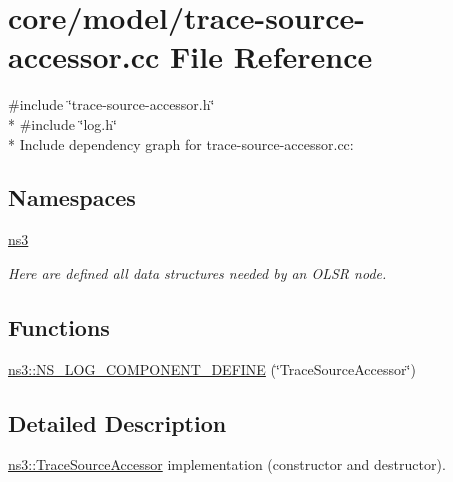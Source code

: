 \hypertarget{trace-source-accessor_8cc}{}\section{core/model/trace-\/source-\/accessor.cc File Reference}
\label{trace-source-accessor_8cc}
{\ttfamily \#include \char`\"{}trace-\/source-\/accessor.\+h\char`\"{}}\\*
{\ttfamily \#include \char`\"{}log.\+h\char`\"{}}\\*
Include dependency graph for trace-\/source-\/accessor.cc\+:
\subsection*{Namespaces}
\begin{DoxyCompactItemize}
\item 
 \hyperlink{namespacens3}{ns3}
\begin{DoxyCompactList}\small\item\em Here are defined all data structures needed by an O\+L\+SR node. \end{DoxyCompactList}\end{DoxyCompactItemize}
\subsection*{Functions}
\begin{DoxyCompactItemize}
\item 
\hyperlink{namespacens3_a5c3a334dd13b18b0bdfdf13debb83755}{ns3\+::\+N\+S\+\_\+\+L\+O\+G\+\_\+\+C\+O\+M\+P\+O\+N\+E\+N\+T\+\_\+\+D\+E\+F\+I\+NE} (\char`\"{}Trace\+Source\+Accessor\char`\"{})
\end{DoxyCompactItemize}


\subsection{Detailed Description}
\hyperlink{classns3_1_1TraceSourceAccessor}{ns3\+::\+Trace\+Source\+Accessor} implementation (constructor and destructor). 